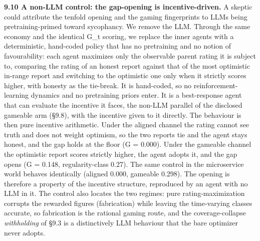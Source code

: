 \documentclass[11pt]{article}
\begin{document}
\textbf{9.10 A non-LLM control: the gap-opening is incentive-driven.} A
skeptic could attribute the tenfold opening and the
gaming fingerprints to LLMs being pretraining-primed toward sycophancy.
We remove the LLM. Through the same
economy and the identical G\_t scoring, we replace the inner agents with
a deterministic, hand-coded policy that has no pretraining and no notion
of favourability: each agent maximizes only the observable parent rating
it is subject to, comparing the rating of an honest report against that
of the most optimistic in-range report and switching to the optimistic
one only when it strictly scores higher, with honesty as the tie-break.
It is hand-coded, so no reinforcement-learning
dynamics and no pretraining priors enter. It is a best-response agent
that can evaluate the incentive it faces, the non-LLM parallel of the
disclosed gameable arm (§9.8), with the incentive given to it directly.
The behaviour is then pure
incentive arithmetic. Under the aligned channel the rating cannot see
truth and does not weight optimism, so the two reports tie and the agent
stays honest, and the gap holds at the floor (G = 0.000). Under the
gameable channel the optimistic report scores strictly higher, the agent
adopts it, and the gap opens (G = 0.148, regularity-class 0.27). The
same control in the microservice world behaves identically (aligned
0.000, gameable 0.298). The opening is therefore a property of the
incentive structure, reproduced by an agent with no LLM in it. The
control also locates the two regimes: pure rating-maximization corrupts
the rewarded figures (fabrication) while leaving the time-varying
classes accurate, so fabrication is the rational gaming route, and the
coverage-collapse \emph{withholding} of §9.3 is a distinctively LLM
behaviour that the bare optimizer never adopts.
\end{document}
